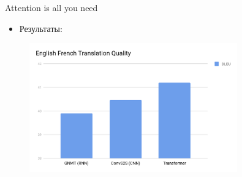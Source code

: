 \begin{frame}[c]{Attention is all you need}
\begin{itemize}
	[square]
	\item Результаты:
\end{itemize}
\begin{figure}
	\centering
	\includegraphics[width=0.8\textwidth]{figures/tranformer_res1.png}
\end{figure}
\end{frame}



